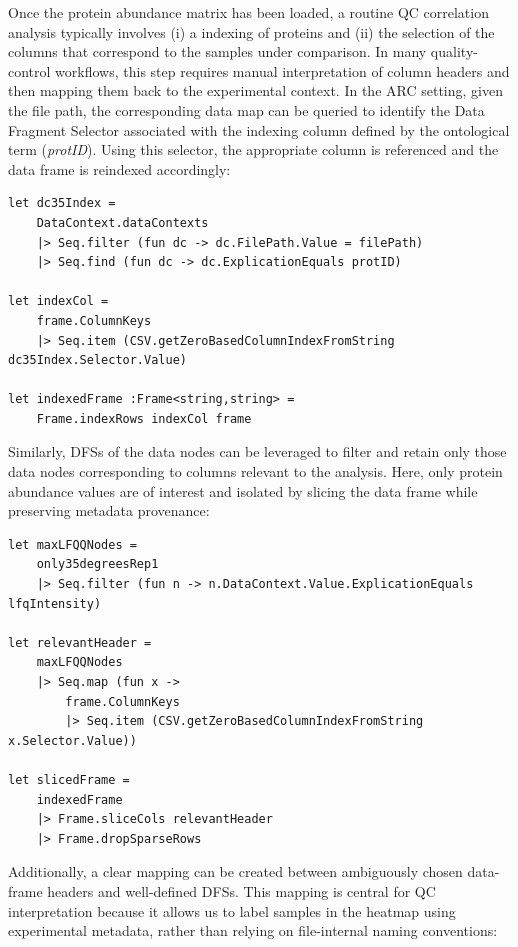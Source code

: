 \documentclass{jib}
\begin{document}
Once the protein abundance matrix has been loaded, a routine QC correlation analysis typically involves (i) a indexing of proteins and (ii) the selection of the columns that correspond to the samples under comparison. In many quality-control workflows, this step requires manual interpretation of column headers and then mapping them back to the experimental context. In the ARC setting, given the file path, the corresponding data map can be queried to identify the Data Fragment Selector associated with the indexing column defined by the ontological term (\emph{protID}). Using this selector, the appropriate column is referenced and the data frame is reindexed accordingly:

\begin{verbatim}
let dc35Index = 
    DataContext.dataContexts
    |> Seq.filter (fun dc -> dc.FilePath.Value = filePath)
    |> Seq.find (fun dc -> dc.ExplicationEquals protID) 
    
let indexCol = 
    frame.ColumnKeys 
    |> Seq.item (CSV.getZeroBasedColumnIndexFromString dc35Index.Selector.Value) 

let indexedFrame :Frame<string,string> =   
    Frame.indexRows indexCol frame
\end{verbatim}

Similarly, DFSs of the data nodes can be leveraged to filter and retain only those data nodes corresponding to columns relevant to the analysis. Here, only protein abundance values are of interest and isolated by slicing the data frame while preserving metadata provenance:

\begin{verbatim}
let maxLFQQNodes = 
    only35degreesRep1
    |> Seq.filter (fun n -> n.DataContext.Value.ExplicationEquals lfqIntensity)

let relevantHeader = 
    maxLFQQNodes 
    |> Seq.map (fun x -> 
        frame.ColumnKeys
        |> Seq.item (CSV.getZeroBasedColumnIndexFromString x.Selector.Value)) 
        
let slicedFrame = 
    indexedFrame
    |> Frame.sliceCols relevantHeader
    |> Frame.dropSparseRows    
\end{verbatim}

Additionally, a clear mapping can be created between ambiguously chosen data-frame headers and well-defined DFSs. This mapping is central for QC interpretation because it allows us to label samples in the heatmap using experimental metadata, rather than relying on file-internal naming conventions:
\end{document}
